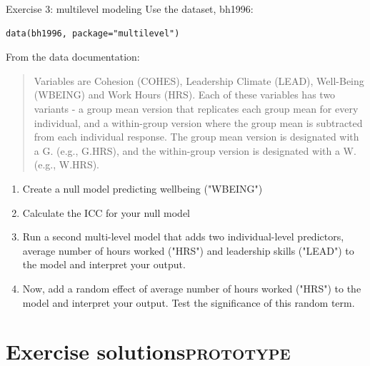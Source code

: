 \documentclass[table,smaller]{beamer}
\begin{document}
\begin{frame}[fragile,label=sec-5-8]{Exercise 3: multilevel modeling}
 Use the dataset, bh1996:
\begin{verbatim}
data(bh1996, package="multilevel")
\end{verbatim}

From the data documentation:
\begin{quote}
Variables are Cohesion (COHES), Leadership Climate (LEAD),
Well-Being (WBEING) and Work Hours (HRS).  Each of these variables
has two variants - a group mean version that replicates each group
mean for every individual, and a within-group version where the
group mean is subtracted from each individual response.  The group
mean version is designated with a G. (e.g., G.HRS), and the
within-group version is designated with a W. (e.g., W.HRS).
\end{quote}

\begin{enumerate}
\item Create a null model predicting wellbeing ("WBEING")
\item Calculate the ICC for your null model
\item Run a second multi-level model that adds two individual-level predictors, average number of hours worked ("HRS") and leadership skills ("LEAD") to the model and interpret your output.
\item Now, add a random effect of average number of hours worked ("HRS") to the model and interpret your output.  Test the significance of this random term.
\end{enumerate}
\end{frame}


\section{Exercise solutions\hfill{}\textsc{prototype}}
\label{sec-6}
\end{document}
